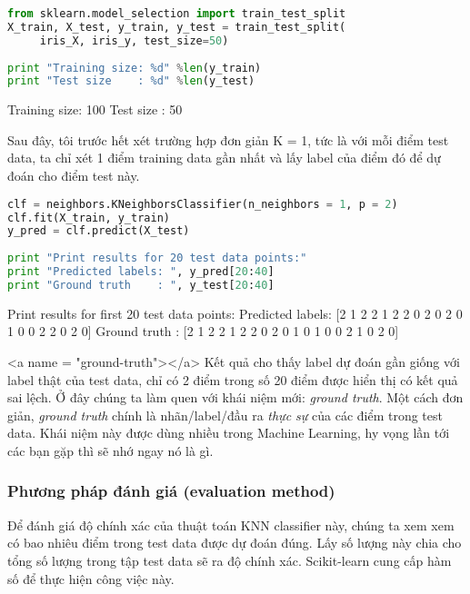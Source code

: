  
\begin{lstlisting}[language=Python]
from sklearn.model_selection import train_test_split 
X_train, X_test, y_train, y_test = train_test_split( 
     iris_X, iris_y, test_size=50) 
 
print "Training size: %d" %len(y_train) 
print "Test size    : %d" %len(y_test) 
\end{lstlisting}
 
    Training size: 100 
    Test size    : 50 
 
 
Sau đây, tôi trước hết xét trường hợp đơn giản K = 1, tức là với mỗi điểm test data, ta chỉ xét 1 điểm training data gần nhất và lấy label của điểm đó để dự đoán cho điểm test này. 
 
 
\begin{lstlisting}[language=Python]
clf = neighbors.KNeighborsClassifier(n_neighbors = 1, p = 2) 
clf.fit(X_train, y_train) 
y_pred = clf.predict(X_test) 
 
print "Print results for 20 test data points:" 
print "Predicted labels: ", y_pred[20:40] 
print "Ground truth    : ", y_test[20:40] 
\end{lstlisting}
 
    Print results for first 20 test data points: 
    Predicted labels:  [2 1 2 2 1 2 2 0 2 0 2 0 1 0 0 2 2 0 2 0] 
    Ground truth    :  [2 1 2 2 1 2 2 0 2 0 1 0 1 0 0 2 1 0 2 0] 
 
<a name = "ground-truth"></a> 
Kết quả cho thấy label dự đoán gần giống với label thật của test data, chỉ có 2 điểm trong số 20 điểm được hiển thị có kết quả sai lệch. Ở đây chúng ta làm quen với khái niệm mới: \textit{ground truth}. Một cách đơn giản, \textit{ground truth} chính là nhãn/label/đầu ra \textit{thực sự} của các điểm trong test data. Khái niệm này được dùng nhiều trong Machine Learning, hy vọng lần tới các bạn gặp thì sẽ nhớ ngay nó là gì.  
 
 
 
\subsubsection{Phương pháp đánh giá (evaluation method)}
Để đánh giá độ chính xác của thuật toán KNN classifier này, chúng ta xem xem có bao nhiêu điểm trong test data được dự đoán đúng. Lấy số lượng này chia cho tổng số lượng trong tập test data sẽ ra độ chính xác. Scikit-learn cung cấp hàm số \href{http://scikit-learn.org/stable/modules/generated/sklearn.metrics.accuracy_score.html}{} để thực hiện công việc này. 
 
